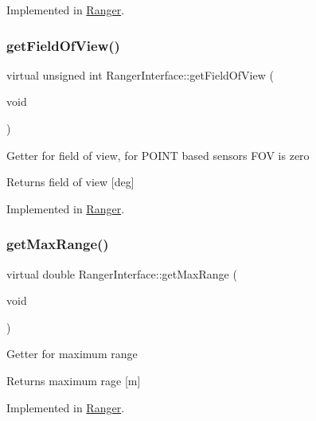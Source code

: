 Implemented in \hyperlink{classRanger_a95b5013ae191d1e19b93fab002306718}{Ranger}.

\mbox{\label{classRangerInterface_a18716da6932402b8dda75f682be6f06c}} 
\subsubsection{\texorpdfstring{get\+Field\+Of\+View()}{getFieldOfView()}}
{\footnotesize\ttfamily virtual unsigned int Ranger\+Interface\+::get\+Field\+Of\+View (\begin{DoxyParamCaption}\item[{void}]{ }\end{DoxyParamCaption})\hspace{0.3cm}{\ttfamily [pure virtual]}}

Getter for field of view, for P\+O\+I\+NT based sensors F\+OV is zero \begin{DoxyReturn}{Returns}
field of view \mbox{[}deg\mbox{]} 
\end{DoxyReturn}


Implemented in \hyperlink{classRanger_a4bca7dce56b7959257d90b1f30bf0271}{Ranger}.

\mbox{\label{classRangerInterface_a0bb29a41de5767c99081002c0590c186}} 
\subsubsection{\texorpdfstring{get\+Max\+Range()}{getMaxRange()}}
{\footnotesize\ttfamily virtual double Ranger\+Interface\+::get\+Max\+Range (\begin{DoxyParamCaption}\item[{void}]{ }\end{DoxyParamCaption})\hspace{0.3cm}{\ttfamily [pure virtual]}}

Getter for maximum range \begin{DoxyReturn}{Returns}
maximum rage \mbox{[}m\mbox{]} 
\end{DoxyReturn}


Implemented in \hyperlink{classRanger_aba5e81260e55089d9ff869051156a722}{Ranger}.

